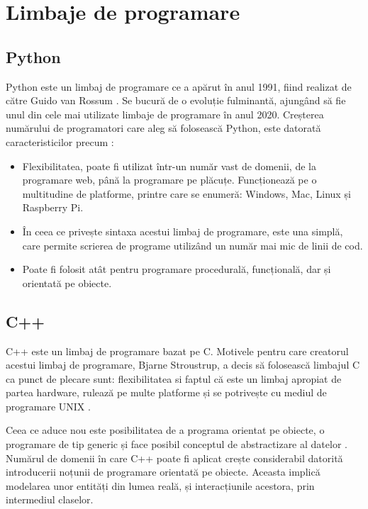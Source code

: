 \section{Limbaje de programare}

\subsection{Python}

	Python este un limbaj de programare ce a apărut în anul 1991, fiind realizat de către Guido van Rossum \cite{python}. Se bucură de o evoluție fulminantă, ajungând să fie unul din cele mai utilizate limbaje de programare în anul 2020. Creșterea numărului de programatori care aleg să folosească Python, este datorată  caracteristicilor precum \cite{python}: 
	\begin{itemize}
	\setlength{\itemindent}{2em}
	\itemsep0em
	\item Flexibilitatea, poate fi utilizat într-un număr vast de domenii, de la programare web, până la programare pe plăcuțe. Funcționează pe o multitudine de platforme, printre care se enumeră: Windows, Mac, Linux și Raspberry Pi. 
	\item În ceea ce privește sintaxa acestui limbaj de programare, este una simplă, care permite scrierea de programe utilizând un număr mai mic de linii de cod. 
	\item Poate fi folosit atât pentru programare procedurală, funcțională, dar și orientată pe obiecte.
	\end{itemize}

\subsection{C++}

	C++ este un limbaj de programare bazat pe C. Motivele pentru care creatorul acestui limbaj de programare, Bjarne Stroustrup, a decis să folosească limbajul C ca punct de plecare sunt: flexibilitatea si faptul că este un limbaj apropiat de partea hardware, rulează pe multe platforme și se potrivește cu mediul de programare UNIX \cite{c++}.

	Ceea ce aduce nou este posibilitatea de a programa orientat pe obiecte, o programare de tip generic și face posibil conceptul de abstractizare al datelor \cite{c++}. Numărul de domenii în care C++ poate fi aplicat crește considerabil datorită introducerii noțunii de programare orientată pe obiecte. Aceasta implică modelarea unor entități din lumea reală, și interacțiunile acestora, prin intermediul claselor. 


